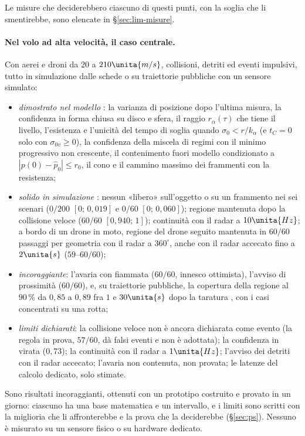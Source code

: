 Le misure che deciderebbero ciascuno di questi punti, con la soglia che li smentirebbe, sono elencate in \S\ref{sec:lim-misure}.

\paragraph{Nel volo ad alta velocità, il caso centrale.} Con aerei e droni da $20$ a $210\unita{m/s}$, collisioni, detriti ed eventi impulsivi, tutto in simulazione dalle schede o su traiettorie pubbliche con un sensore simulato:
\begin{itemize}
\item \emph{dimostrato nel modello} : la varianza di posizione dopo l'ultima misura, la confidenza in forma chiusa su disco e sfera, il raggio $r_\alpha(\tau)$ che tiene il livello, l'esistenza e l'unicità del tempo di soglia quando $\sigma_0<r/k_\alpha$ (e $t_C=0$ solo con $\sigma_{0v}\ge0$), la confidenza della miscela di regimi con il minimo progressivo non crescente, il contenimento fuori modello condizionato a $|p(0)-\hat p_0|\le r_0$, il cono e il cammino massimo dei frammenti con la resistenza;
\item \emph{solido in simulazione} : nessun «libero» sull'oggetto o su un frammento nei sei scenari ($0/200$ $[0;\,0{,}019]$ e $0/60$ $[0;\,0{,}060]$); regione mantenuta dopo la collisione veloce ($60/60$ $[0{,}940;\,1]$); continuità con il radar a $10\unita{Hz}$; a bordo di un drone in moto, regione del drone seguito mantenuta in $60/60$ passaggi per geometria con il radar a $360^\circ$, anche con il radar accecato fino a $2\unita{s}$ ($59$--$60/60$);
\item \emph{incoraggiante}: l'avaria con fiammata ($60/60$, innesco ottimista), l'avviso di prossimità ($60/60$), e, su traiettorie pubbliche, la copertura della regione al $90\,\%$ da $0{,}85$ a $0{,}89$ fra $1$ e $30\unita{s}$ dopo la taratura , con i casi concentrati su una rotta;
\item \emph{limiti dichiarati}: la collisione veloce non è ancora dichiarata come evento (la regola in prova, $57/60$, dà falsi eventi e non è adottata); la confidenza in virata ($0{,}73$); la continuità con il radar a $1\unita{Hz}$; l'avviso dei detriti con il radar accecato; l'avaria non contenuta, non provata; le latenze del calcolo dedicato, solo stimate.
\end{itemize}
Sono risultati incoraggianti, ottenuti con un prototipo costruito e provato in un giorno: ciascuno ha una base matematica e un intervallo, e i limiti sono scritti con la miglioria che li affronterebbe e la prova che la deciderebbe (\S\ref{sec:ps}). Nessuno è misurato su un sensore fisico o su hardware dedicato.

